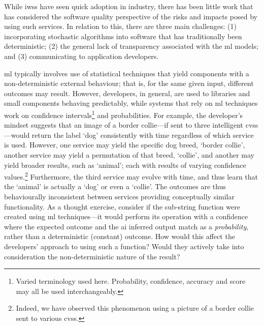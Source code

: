 While \glspl{iws} have seen quick adoption in industry, there has been little work that has considered the software quality perspective of the risks and impacts posed by using such services. In relation to this, there are three main challenges: (1) incorporating stochastic algorithms into software that has traditionally been deterministic; (2) the general lack of transparency associated with the \gls{ml} models; and (3) communicating to application developers.

\gls{ml} typically involves use of statistical techniques that yield components with a non-deterministic external behaviour; that is, for the same given input, different outcomes may result. However, developers, in general, are used to libraries and small components behaving predictably, while systems that rely on \gls{ml} techniques work on confidence intervals\footnote{Varied terminology used here. Probability, confidence, accuracy and score may all be used interchangeably.} and probabilities. For example, the developer's mindset suggests that an image of a border collie---if sent to three intelligent \glspl{cvs}---would return the label `dog' consistently with time regardless of which service is used. However, one service may yield the specific dog breed, `border collie', another service may yield a permutation of that breed, `collie', and another may yield broader results, such as `animal'; each with results of varying confidence values.\footnote{Indeed, we have observed this phenomenon using a picture of a border collie sent to various \glspl{cvs}.}  
Furthermore, the third service may evolve with time, and thus learn that the `animal' is actually a `dog' or even a `collie'. The outcomes are thus behaviourally inconsistent between services providing conceptually similar functionality.
As a thought exercise, consider if the sub-string function were created using \gls{ml} techniques---it would perform its operation with a confidence where the expected outcome and the \gls{ai} inferred output match as a \textit{probability}, rather than a deterministic (constant) outcome. How would this affect the developers' approach to using such a  function? Would they actively take into consideration the non-deterministic nature of the result? 

